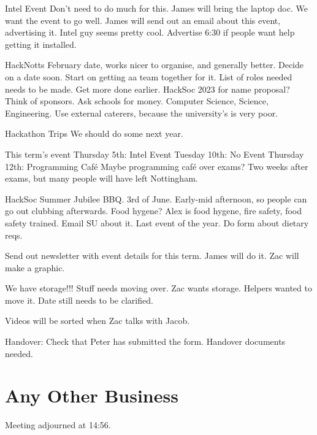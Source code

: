 \documentclass[11pt,hacksoc]{meetingmins}
\begin{document}
\begin{items}


\item Intel Event
\subitem Don't need to do much for this.
\subitem James will bring the laptop doc.
\subitem We want the event to go well.
\subitem James will send out an email about this event, advertising it.
\subitem Intel guy seems pretty cool.
\subitem Advertise 6:30 if people want help getting it installed.

\item HackNotts
\subitem February date, works nicer to organise, and generally better.
\subitem Decide on a date soon.
\subitem Start on getting aa team together for it.
\subsubitem List of roles needed needs to be made.
\subitem Get more done earlier.
\subitem HackSoc 2023 for name proposal?
\subitem Think of sponsors.
\subitem Ask schools for money. Computer Science, Science, Engineering.
\subitem Use external caterers, because the university's is very poor.

\item Hackathon Trips
\subitem We should do some next year.

\item This term's event
\subitem Thursday 5th: Intel Event
\subitem Tuesday 10th: No Event
\subitem Thursday 12th: Programming Café
\subitem Maybe programming café over exams?
\subitem Two weeks after exams, but many people will have left Nottingham.

\item HackSoc Summer Jubilee BBQ.
\subitem 3rd of June.
\subitem Early-mid afternoon, so people can go out clubbing afterwards.
\subitem Food hygene?
\subitem Alex is food hygene, fire safety, food safety trained.
\subitem Email SU about it.
\subitem Last event of the year.
\subitem Do form about dietary reqs.

\item Send out newsletter with event details for this term.
\subitem James will do it.
\subitem Zac will make a graphic.

\item We have storage!!!
\subitem Stuff needs moving over.
\subitem Zac wants storage.
\subitem Helpers wanted to move it.
\subitem Date still needs to be clarified.

\item Videos will be sorted when Zac talks with Jacob.

\item Handover:
\subitem Check that Peter has submitted the form.
\subitem Handover documents needed.


\end{items}

\section{Any Other Business}



\vspace{1em}

Meeting adjourned at 14:56.
\end{document}
